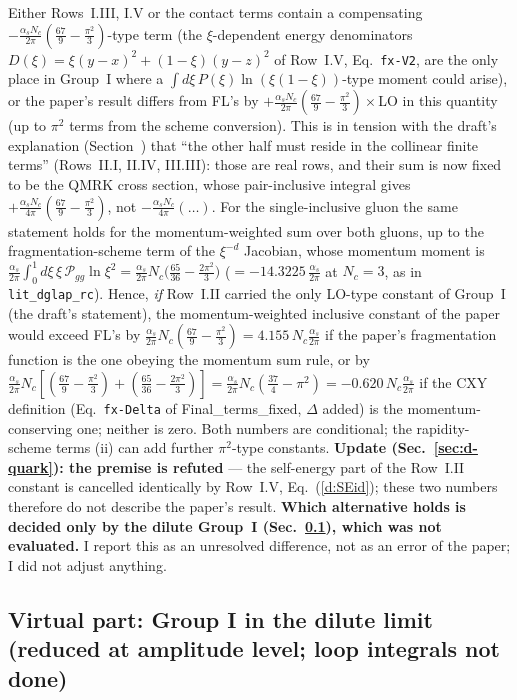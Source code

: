 Either Rows~I.III, I.V or the contact terms contain a compensating $-\frac{\alpha_sN_c}{2\pi}(\frac{67}{9}-\frac{\pi^2}{3})$-type term (the $\xi$-dependent energy denominators $D(\xi)=\xi(y-x)^2+(1-\xi)(y-z)^2$ of Row~I.V, Eq.~\texttt{fx-V2}, are the only place in Group~I where a $\int d\xi\,P(\xi)\ln(\xi(1-\xi))$-type moment could arise), or the paper's result differs from FL's by $+\frac{\alpha_sN_c}{2\pi}(\frac{67}{9}-\frac{\pi^2}{3})\times$LO in this quantity (up to $\pi^2$ terms from the scheme conversion). This is in tension with the draft's explanation (Section~) that ``the other half must reside in the collinear finite terms'' (Rows~II.I, II.IV, III.III): those are real rows, and their sum is now fixed to be the QMRK cross section, whose pair-inclusive integral gives $+\frac{\alpha_sN_c}{4\pi}(\frac{67}{9}-\frac{\pi^2}{3})$, not $-\frac{\alpha_sN_c}{4\pi}(\dots)$. For the single-inclusive gluon the same statement holds for the momentum-weighted sum over both gluons, up to the fragmentation-scheme term of the $\xi^{-d}$ Jacobian, whose momentum moment is $\frac{\alpha_s}{2\pi}\int_0^1d\xi\,\xi\,\mathcal P_{gg}\ln\xi^2=\frac{\alpha_s}{2\pi}N_c\big(\frac{65}{36}-\frac{2\pi^2}{3}\big)$ ($=-14.3225\,\frac{\alpha_s}{2\pi}$ at $N_c=3$, as in \texttt{lit\_dglap\_rc}). Hence, \emph{if} Row~I.II carried the only LO-type constant of Group~I (the draft's statement), the momentum-weighted inclusive constant of the paper would exceed FL's by $\frac{\alpha_s}{2\pi}N_c(\frac{67}{9}-\frac{\pi^2}{3})=4.155\,N_c\frac{\alpha_s}{2\pi}$ if the paper's fragmentation function is the one obeying the momentum sum rule, or by $\frac{\alpha_s}{2\pi}N_c[(\frac{67}{9}-\frac{\pi^2}{3})+(\frac{65}{36}-\frac{2\pi^2}{3})]=\frac{\alpha_s}{2\pi}N_c(\frac{37}{4}-\pi^2)=-0.620\,N_c\frac{\alpha_s}{2\pi}$ if the CXY definition (Eq.~\texttt{fx-Delta} of Final\_terms\_fixed, $\Delta$ added) is the momentum-conserving one; neither is zero. Both numbers are conditional; the rapidity-scheme terms (ii) can add further $\pi^2$-type constants. \textbf{Update (Sec.~\ref{sec:d-quark}): the premise is refuted} --- the self-energy part of the Row~I.II constant is cancelled identically by Row~I.V, Eq.~(\ref{d:SEid}); these two numbers therefore do not describe the paper's result. \textbf{Which alternative holds is decided only by the dilute Group~I (Sec.~\ref{sec:d-virt}), which was not evaluated.} I report this as an unresolved difference, not as an error of the paper; I did not adjust anything.

\subsection{Virtual part: Group I in the dilute limit (reduced at amplitude level; loop integrals not done)}\label{sec:d-virt}
